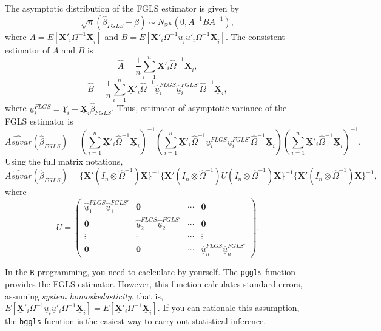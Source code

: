 \documentclass[
  12pt,
]{article}
\begin{document}
The asymptotic distribution of the FGLS estimator is given by \[
  \sqrt{n}(\hat{\beta}_{FGLS} - \beta) \sim N_{\mathbb{R}^K}(0, A^{-1} B A^{-1}),
\] where
\(A = E[\underline{\mathbf{X}}'_i \Omega^{-1} \underline{\mathbf{X}}_i]\)
and
\(B = E[\underline{\mathbf{X}}'_i \Omega^{-1} \underline{u}_i \underline{u}'_i \Omega^{-1} \underline{\mathbf{X}}_i]\).
The consistent estimator of \(A\) and \(B\) is \[
  \hat{A} = \frac{1}{n} \sum_{i=1}^n \underline{\mathbf{X}}'_i \hat{\Omega}^{-1} \underline{\mathbf{X}}_i,
\] \[
  \hat{B} 
  = \frac{1}{n} \sum_{i=1}^n
  \underline{\mathbf{X}}'_i \hat{\Omega}^{-1} 
  \underline{\hat{u}}^{FLGS}_i \underline{\hat{u}}^{FGLS'}_i 
  \hat{\Omega}^{-1} \underline{\mathbf{X}}_i,
\] where
\(\underline{u}^{FLGS}_i = \underline{Y}_i - \underline{\mathbf{X}}_i \hat{\beta}_{FGLS}\).
Thus, estimator of asymptotic variance of the FGLS estimator is \[
  \widehat{Asyvar}(\hat{\beta}_{FGLS}) =
  \left( \sum_{i=1}^n \underline{\mathbf{X}}'_i \hat{\Omega}^{-1} \underline{\mathbf{X}}_i \right)^{-1}
  \left( \sum_{i=1}^n \underline{\mathbf{X}}'_i \hat{\Omega}^{-1} 
  \underline{u}^{FLGS}_i \underline{u}^{FGLS'}_i 
  \hat{\Omega}^{-1} \underline{\mathbf{X}}_i \right)
  \left( \sum_{i=1}^n \underline{\mathbf{X}}'_i \hat{\Omega}^{-1} \underline{\mathbf{X}}_i \right)^{-1}.
\] Using the full matrix notations, \[
  \widehat{Asyvar}(\hat{\beta}_{FGLS}) =
  \{ \mathbf{X}'(I_n \otimes \hat{\Omega}^{-1}) \mathbf{X} \}^{-1}
  \{ \mathbf{X}'(I_n \otimes \hat{\Omega}^{-1}) U (I_n \otimes \hat{\Omega}^{-1}) \mathbf{X} \}^{-1}
  \{ \mathbf{X}'(I_n \otimes \hat{\Omega}^{-1}) \mathbf{X} \}^{-1},
\] where \[
  U = 
  \begin{pmatrix}
    \underline{\hat{u}}^{FLGS}_1 \underline{\hat{u}}^{FGLS'}_1 & \mathbf{0} & \cdots & \mathbf{0} \\
    \mathbf{0} & \underline{\hat{u}}^{FLGS}_2 \underline{\hat{u}}^{FGLS'}_2 & \cdots & \mathbf{0} \\
    \vdots & \vdots & \cdots & \vdots \\
    \mathbf{0} & \mathbf{0} & \cdots & \underline{\hat{u}}^{FLGS}_n \underline{\hat{u}}^{FGLS'}_n
  \end{pmatrix}.
\]

In the \texttt{R} programming, you need to caclculate by yourself. The
\texttt{pggls} function provides the FGLS estimator. However, this
function calculates standard errors, assuming \emph{system
homoskedasticity}, that is,
\(E[\underline{\mathbf{X}}'_i \Omega^{-1} \underline{u}_i \underline{u}'_i \Omega^{-1} \underline{\mathbf{X}}_i] = E[\underline{\mathbf{X}}'_i \Omega^{-1} \underline{\mathbf{X}}_i]\).
If you can rationale this assumption, the \texttt{bggls} fucntion is the
easiest way to carry out statistical inference.
\end{document}
